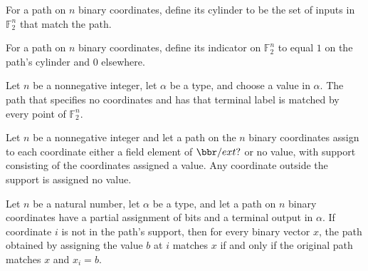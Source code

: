 \begin{definition}
\leanok
{}
For a path on $n$ binary coordinates, define its cylinder to be the set of inputs in
$\mathbb{F}_2^n$ that match the path.
\end{definition}

\begin{definition}
\leanok
{}
For a path on $n$ binary coordinates, define its indicator on $\mathbb{F}_2^n$ to equal
$1$ on the path's cylinder and $0$ elsewhere.
\end{definition}

\begin{theorem}
\leanok
{}
Let $n$ be a nonnegative integer, let $\alpha$ be a type, and choose a value in
$\alpha$. The path that specifies no coordinates and has that terminal label is matched
by every point of $\mathbb{F}_2^n$.
\end{theorem}

\begin{theorem}
\leanok
{}
Let $n$ be a nonnegative integer and let a path on the $n$ binary coordinates assign to
each coordinate either a field element of $\bbr/	ext{?}$ or no value, with support
consisting of the coordinates assigned a value. Any coordinate outside the support is
assigned no value.
\end{theorem}

\begin{theorem}
\leanok
{}
Let $n$ be a natural number, let $\alpha$ be a type, and let a path on $n$ binary
coordinates have a partial assignment of bits and a terminal output in $\alpha$. If
coordinate $i$ is not in the path's support, then for every binary vector $x$, the path
obtained by assigning the value $b$ at $i$ matches $x$ if and only if the original path
matches $x$ and $x_i=b$.
\end{theorem}

